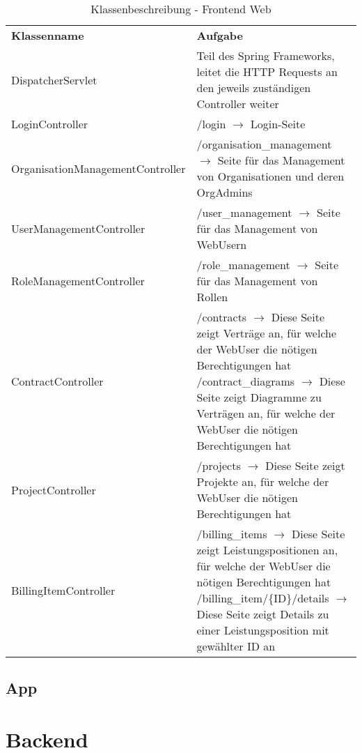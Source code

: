 \begin{table}[h]
	\centering
	\begin{tabularx}{\textwidth}{X X}
		\rowcolor[HTML]{C0C0C0} 
		\textbf{Klassenname} & \textbf{Aufgabe} \\
		DispatcherServlet & Teil des Spring Frameworks, leitet die HTTP Requests an den jeweils zuständigen Controller weiter \\
		\rowcolor[HTML]{E7E7E7} 
		LoginController & /login $\rightarrow$ Login-Seite \\
		OrganisationManagementController & /organisation\_management $\rightarrow$ Seite für das Management von Organisationen und deren OrgAdmins \\
		\rowcolor[HTML]{E7E7E7} 
		UserManagementController & /user\_management $\rightarrow$ Seite für das Management von WebUsern \\
		RoleManagementController & /role\_management $\rightarrow$ Seite für das Management von Rollen \\
		\rowcolor[HTML]{E7E7E7} 
		ContractController & /contracts $\rightarrow$ Diese Seite zeigt Verträge an, für welche der WebUser die nötigen Berechtigungen hat \newline
		/contract\_diagrams $\rightarrow$ Diese Seite zeigt Diagramme zu Verträgen an, für welche der WebUser die nötigen Berechtigungen hat \\
		ProjectController & /projects $\rightarrow$ Diese Seite zeigt Projekte an, für welche der WebUser die nötigen Berechtigungen hat \\
		\rowcolor[HTML]{E7E7E7} 
		BillingItemController & /billing\_items $\rightarrow$ Diese Seite zeigt Leistungspositionen an, für welche der WebUser die nötigen Berechtigungen hat \newline
		/billing\_item/\{ID\}/details $\rightarrow$ Diese Seite zeigt Details zu einer Leistungsposition mit gewählter ID an
	\end{tabularx}
	\caption{Klassenbeschreibung - Frontend Web}
	\label{table:klassenbeschreibung-web}
\end{table}

\clearpage

\subsection{App}

\section{Backend}
